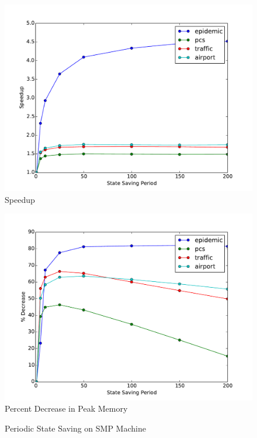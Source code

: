 \documentclass[11pt]{book}
\begin{document}
\begin{figure}
  \begin{minipage}{.5\textwidth}
    \begin{center}
      \includegraphics[width=\textwidth,keepaspectratio]{figs/state_saving/speedup.pdf} \\
      Speedup \\
    \end{center}
  \end{minipage} \hfill
  \begin{minipage}{.5\textwidth}
    \begin{center}
      \includegraphics[width=\textwidth,keepaspectratio]{figs/state_saving/percent_memory_decrease.pdf} \\
      Percent Decrease in Peak Memory \\
    \end{center}
  \end{minipage}
  \caption{Periodic State Saving on SMP Machine}\label{ssp_analysis_smp}
\end{figure}
\end{document}
